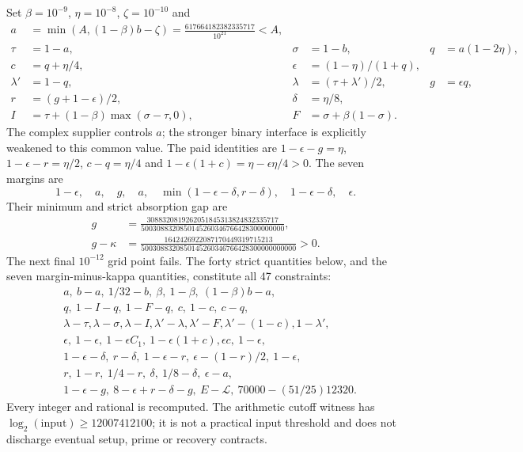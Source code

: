 \documentclass[11pt]{article}
\begin{document}
Set $\beta=10^{-9}$, $\eta=10^{-8}$, $\zeta=10^{-10}$ and
\begin{align*}
 a&=\min(A,(1-\beta)b-\zeta)
   =\frac{617664182382335717}{10^{21}}<A,\\
 \tau&=1-a,&\sigma&=1-b,&q&=a(1-2\eta),\\
 c&=q+\eta/4,&\epsilon&=(1-\eta)/(1+q),\\
 \lambda'&=1-q,&\lambda&=(\tau+\lambda')/2,&g&=\epsilon q,\\
 r&=(g+1-\epsilon)/2,&\delta&=\eta/8,\\
 I&=\tau+(1-\beta)\max(\sigma-\tau,0),&
 F&=\sigma+\beta(1-\sigma).
\end{align*}
The complex supplier controls $a$; the stronger binary interface is
explicitly weakened to this common value.
The paid identities are
$1-\epsilon-g=\eta$, $1-\epsilon-r=\eta/2$,
$c-q=\eta/4$ and $1-\epsilon(1+c)=\eta-\epsilon\eta/4>0$.
The seven margins are
\[
 1-\epsilon,\quad a,\quad g,\quad a,\quad
 \min(1-\epsilon-\delta,r-\delta),\quad1-\epsilon-\delta,\quad\epsilon.
\]
Their minimum and strict absorption gap are
\begin{align*}
 g&=\frac{3088320819262051845313824832335717}
           {5003088320850145260346766428300000000},\\
 g-\kappa&=\frac{1642426922087170449319715213}
              {5003088320850145260346766428300000000000}>0.
\end{align*}
The next final $10^{-12}$ grid point fails.
The forty strict quantities below, and the seven margin-minus-kappa
quantities, constitute all 47 constraints:
\begin{align*}
 &a,\ b-a,\ 1/32-b,\ \beta,\ 1-\beta,\ (1-\beta)b-a,\\
 &q,\ 1-I-q,\ 1-F-q,\ c,\ 1-c,\ c-q,\\
 &\lambda-\tau,\lambda-\sigma,\lambda-I,\lambda'-\lambda,
   \lambda'-F,\lambda'-(1-c),1-\lambda',\\
 &\epsilon,\ 1-\epsilon,\ 1-\epsilon C_1,\ 1-\epsilon(1+c),
   \epsilon c,\ 1-\epsilon,\\
 &1-\epsilon-\delta,\ r-\delta,\ 1-\epsilon-r,\ \epsilon-(1-r)/2,\ 1-\epsilon,\\
 &r,\ 1-r,\ 1/4-r,\ \delta,\ 1/8-\delta,\ \epsilon-a,\\
 &1-\epsilon-g,\ 8-\epsilon+r-\delta-g,\ E-\mathcal L,\ 70000-(51/25)12320.
\end{align*}
Every integer and rational is recomputed. The arithmetic cutoff witness
has $\log_2(\mathrm{input})\ge12007412100$; it is not a practical input
threshold and does not discharge eventual setup, prime or recovery contracts.
\end{document}
